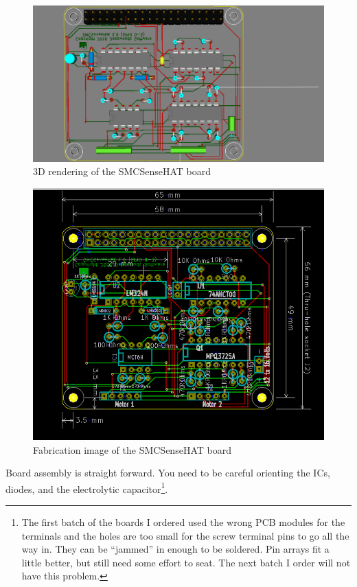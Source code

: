 \begin{figure}[hbpt]\begin{centering}%
\includegraphics[width=5in]{SMCSenseHAT3DTop.png}
\caption{3D rendering of the SMCSenseHAT board}
\end{centering}\end{figure}
\begin{figure}[hbpt]\begin{centering}%
\includegraphics[width=5in]{SMCSenseHAT.png}
\caption{Fabrication image of the SMCSenseHAT board}
\end{centering}\end{figure}
Board assembly is straight forward.  You need to be careful orienting the ICs, 
diodes, and the electrolytic capacitor\footnote{The first batch of the boards 
I ordered used the wrong PCB modules for the terminals and the holes are too 
small for the screw terminal pins to go all the way in.  They can be 
``jammed'' in enough to be soldered. Pin arrays fit a little better, but still 
need some effort to seat.  The next batch I order will not have this 
problem.}. 

